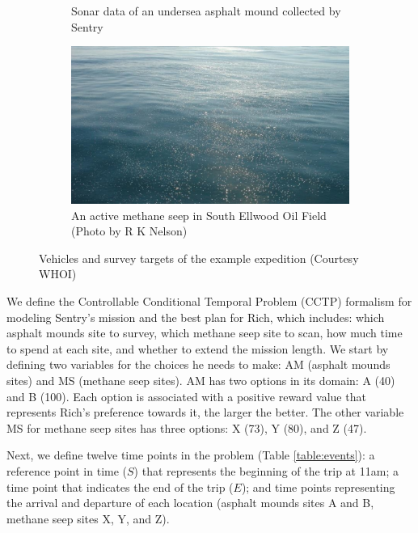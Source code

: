 \documentclass[jair,twoside,11pt,theapa]{article}
\begin{document}
\begin{figure}[ht!]
\begin{subfigure}[b]{0.45\textwidth}
	     \caption{Sonar data of an undersea asphalt mound collected by Sentry}
		 \label{fig:asphalt_domes}
	 \end{subfigure}
	 \begin{subfigure}[b]{0.45\textwidth}
		 \centering	    
	    \includegraphics[width=\textwidth]{figures/methane_seeps.pdf}
	    \caption{An active methane seep in South Ellwood Oil Field (Photo by R K Nelson)}
	    \label{fig:methane_seeps}
	 \end{subfigure}
    \caption{Vehicles and survey targets of the example expedition (Courtesy WHOI)}
   	\label{fig:background_images}

\end{figure}


%


We define the Controllable Conditional Temporal Problem (CCTP) formalism for
modeling Sentry's mission and the best plan for Rich, which includes: which
asphalt mounds site to survey, which methane seep site to scan, how much time to
spend at each site, and whether to extend the mission length. We start by
defining two variables for the choices he needs to make: AM (asphalt mounds
sites) and MS (methane seep sites). AM has two options in its domain: A (40) and
B (100). Each option is associated with a positive reward value that represents
Rich's preference towards it, the larger the better. The other variable MS for
methane seep sites has three options: X (73), Y (80), and Z (47).


Next, we define twelve time points in the problem (Table \ref{table:events}): a
reference point in time ($S$) that represents the beginning of the trip at 11am;
a time point that indicates the end of the trip ($E$); and time points
representing the arrival and departure of each location (asphalt mounds sites A
and B, methane seep sites X, Y, and Z).
\end{document}
